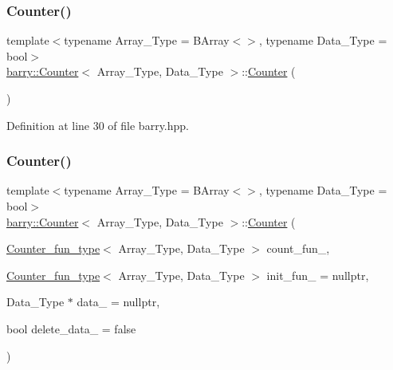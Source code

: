 \subsubsection{\texorpdfstring{Counter()}{Counter()}\hspace{0.1cm}{\footnotesize\ttfamily [1/2]}}
{\footnotesize\ttfamily template$<$typename Array\+\_\+\+Type  = B\+Array$<$$>$, typename Data\+\_\+\+Type  = bool$>$ \\
\hyperlink{classbarry_1_1_counter}{barry\+::\+Counter}$<$ Array\+\_\+\+Type, Data\+\_\+\+Type $>$\+::\hyperlink{classbarry_1_1_counter}{Counter} (\begin{DoxyParamCaption}{ }\end{DoxyParamCaption})\hspace{0.3cm}{\ttfamily [inline]}}



Definition at line 30 of file barry.\+hpp.

\mbox{\label{classbarry_1_1_counter_a1e886197c8f42b2552ada2786726fa38}} 
\subsubsection{\texorpdfstring{Counter()}{Counter()}\hspace{0.1cm}{\footnotesize\ttfamily [2/2]}}
{\footnotesize\ttfamily template$<$typename Array\+\_\+\+Type  = B\+Array$<$$>$, typename Data\+\_\+\+Type  = bool$>$ \\
\hyperlink{classbarry_1_1_counter}{barry\+::\+Counter}$<$ Array\+\_\+\+Type, Data\+\_\+\+Type $>$\+::\hyperlink{classbarry_1_1_counter}{Counter} (\begin{DoxyParamCaption}\item[{\hyperlink{namespacebarry_abaaae3200da8e4b7faac3c04fe9c3081}{Counter\+\_\+fun\+\_\+type}$<$ Array\+\_\+\+Type, Data\+\_\+\+Type $>$}]{count\+\_\+fun\+\_\+,  }\item[{\hyperlink{namespacebarry_abaaae3200da8e4b7faac3c04fe9c3081}{Counter\+\_\+fun\+\_\+type}$<$ Array\+\_\+\+Type, Data\+\_\+\+Type $>$}]{init\+\_\+fun\+\_\+ = {\ttfamily nullptr},  }\item[{Data\+\_\+\+Type $\ast$}]{data\+\_\+ = {\ttfamily nullptr},  }\item[{bool}]{delete\+\_\+data\+\_\+ = {\ttfamily false} }\end{DoxyParamCaption})\hspace{0.3cm}{\ttfamily [inline]}}



